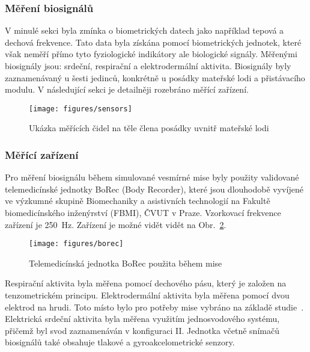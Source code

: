 \subsubsection{Měření biosignálů}
\label{subsubsec:mereni_biosignalu}
V minulé sekci byla zmínka o biometrických datech jako například tepová a
dechová frekvence. Tato data byla získána pomocí biometrických jednotek, které
však neměří přímo tyto fyziologické indikátory ale biologické signály. Měřenými
biosignály jsou: srdeční, respirační a elektrodermální aktivita. Biosignály byly
zaznamenávaný u šesti jedinců, konkrétně u posádky mateřské lodi a přistávacího
modulu. V následující sekci je detailněji rozebráno měřící zařízení.

\begin{figure}[!htb]
    \begin{center}
        \texttt{[image: figures/sensors]}
        \caption{Ukázka měřících čidel na těle člena posádky uvnitř mateřské lodi}
        \label{fig:sensors}
    \end{center}
\end{figure}

\subsubsection{Měřící zařízení}
\label{subsubsec:merici_zarizeni}
Pro měření biosignálu během simulované vesmírné mise byly použity validované
telemedicínské jednotky BoRec (Body Recorder), které jsou dlouhodobě vyvíjené ve
výzkumné skupině Biomechaniky a asistivních technologií na Fakultě
biomedicínského inženýrství (\gls{FBMI}), ČVUT v Praze. Vzorkovací frekvence
zařízení je 250~Hz. Zařízení je možné vidět vidět na Obr.~\ref{fig:borec}.

\begin{figure}[!htb]
    \begin{center}
        \texttt{[image: figures/borec]}
        \caption{Telemedicínská jednotka BoRec použita během mise}
        \label{fig:borec}
    \end{center}
\end{figure}

Respirační aktivita byla měřena pomocí dechového pásu, který je založen na
tenzometrickém principu. Elektrodermální aktivita byla měřena pomocí dvou
elektrod na hrudi. Toto místo bylo pro potřeby mise vybráno na základě
studie~\cite{Janssen2012}. Elektrická srdeční aktivita byla měřena využitím
jednosvodového systému, přičemž byl svod zaznamenáván v konfiguraci II. Jednotka
včetně snímačů biosignálů také obsahuje tlakové a gyroakcelometrické senzory.

